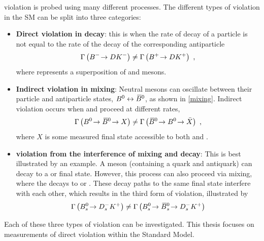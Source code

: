 \CP violation is probed using many different processes. The different types of \CP violation in the SM can be split into three categories:
\begin{itemize}
\item \textbf{Direct \CP violation in decay}: this is when the rate of decay of a particle is not equal to the rate of the decay of the corresponding antiparticle \eg
\begin{equation*}
\Gamma\left({{{B}^-}}\!\rightarrow {\ensuremath{D}}{\ensuremath{{K}^-}}\right) \neq \Gamma\left({{{B}^+}}\!\rightarrow {\ensuremath{D}}{\ensuremath{{K}^+}}\right) \text{ ,}
\end{equation*}
where \D represents a  superposition of \Dz and \Dzb mesons.
\item \textbf{Indirect \CP violation in mixing}: Neutral mesons can oscillate between their particle and antiparticle states, ${{B}^0} \leftrightarrow {\ensuremath{{\kern 0.18em\overline{\kern -0.18em B}{}}{}^0}}$, as shown in \fig\ref{mixing}. Indirect \CP violation occurs when \decay{\Bz}{\Bzb} and \decay{\Bzb}{\Bz} proceed at different rates, \eg
\begin{equation*}
\Gamma\left({{B}^0}\!\rightarrow {\ensuremath{{\kern 0.18em\overline{\kern -0.18em B}{}}{}^0}}\!\rightarrow X\right) \neq \Gamma\left({{\kern 0.18em\overline{\kern -0.18em B}{}}{}^0}\!\rightarrow {\ensuremath{{B}^0}}\!\rightarrow \bar{X}\right) \text{ ,}
\end{equation*}
where $X$ is some measured final state accessible to both \Bz and \Bzb.

\item \textbf{\CP violation from the interference of mixing and decay}: This is best illustrated by an example. A \Bs meson (containing a \bquark quark and \squark antiquark) can decay to a \Dsm\Kp or \Dsp\Km final state. However, this process can also proceed via \decay{\Bs}{\Bsb} mixing, where the \Bsb decays to \Dsm\Kp or \Dsp\Km. These decay paths to the same final state interfere with each other, which results in the third form of \CP violation, illustrated by 
\begin{equation*}
\Gamma\left({{B}^0_{s}}\!\rightarrow {\ensuremath{{D}^-_{s}}}{\ensuremath{{K}^+}}\right) \neq \Gamma\left({{B}^0_{s}}\!\rightarrow {\ensuremath{{\kern 0.18em\overline{\kern -0.18em B}{}}{}^0_{s}}}\!\rightarrow {\ensuremath{{D}^-_{s}}}{\ensuremath{{K}^+}}\right)
\end{equation*}
\end{itemize} 

Each of these three types of \CP violation can be investigated. This thesis focuses on measurements of direct \CP violation within the Standard Model.

